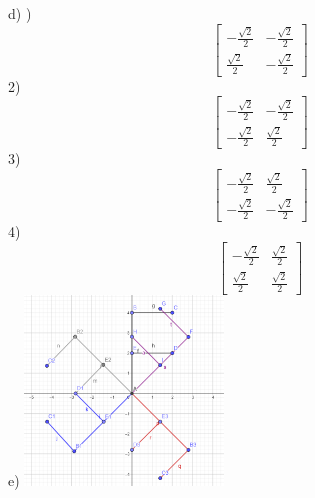 \documentclass[11pt]{article}
\begin{document}
    d) )
    \[\begin{bmatrix}
                     -\frac{\sqrt{2}}{2} & -\frac{\sqrt{2}}{2} \\
                     \frac{\sqrt{2}}{2}  & -\frac{\sqrt{2}}{2}
    \end{bmatrix} \]
    2)
    \[\begin{bmatrix}
                     -\frac{\sqrt{2}}{2} & -\frac{\sqrt{2}}{2} \\
                     -\frac{\sqrt{2}}{2} &  \frac{\sqrt{2}}{2}
    \end{bmatrix} \]
    3)
    \[ \begin{bmatrix}
                     -\frac{\sqrt{2}}{2} &  \frac{\sqrt{2}}{2} \\
                     -\frac{\sqrt{2}}{2} & -\frac{\sqrt{2}}{2}
    \end{bmatrix} \]
    4)
    \[\begin{bmatrix}
                     -\frac{\sqrt{2}}{2} & \frac{\sqrt{2}}{2} \\
                     \frac{\sqrt{2}}{2}  & \frac{\sqrt{2}}{2}
    \end{bmatrix} \]
    e)
    \includegraphics[width=200px]{coord2.PNG}
\end{document}
